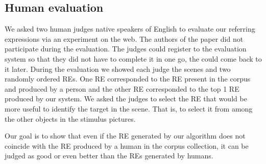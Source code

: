 
\subsection{Human evaluation} \label{sec:humanevaluation}

We asked two human judges native speakers of English to evaluate our referring expressions via an experiment on the web. The authors of the paper did not participate during the evaluation. The judges could register to the evaluation system so that they did not have to complete it in one go, the could come back to it later. During the evaluation we showed each judge the scenes and two randomly ordered REs. One RE corresponded to the RE present in the corpus and produced by a person and the other RE corresponded to the top 1 RE produced by our system. We asked the judges to select the RE that would be more useful to identify the target in the scene. That is, to select it from among the other objects in the stimulus pictures. 

Our goal is to show that even if the RE generated by our algorithm does not coincide with the RE produced by a human in the corpus collection, it can be judged as good or even better than the REs generated by humans. 




